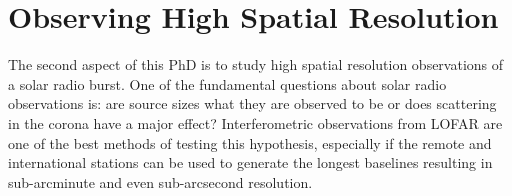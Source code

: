 

\section{Observing High Spatial Resolution}
\label{sec:event}
The second aspect of this PhD is to study high spatial resolution observations of a solar radio burst. One of the fundamental questions about solar radio observations is: are source sizes what they are observed to be or does scattering in the corona have a major effect? Interferometric observations from LOFAR are one of the best methods of testing this hypothesis, especially if the remote and international stations can be used to generate the longest baselines resulting in sub-arcminute and even sub-arcsecond resolution.

